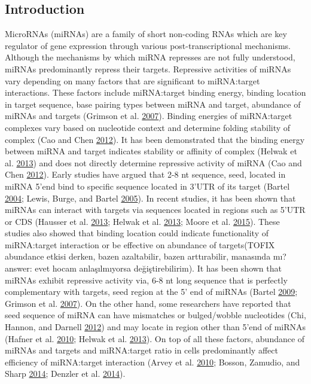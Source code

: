 \documentclass[]{article}
\begin{document}
\hypertarget{introduction}{%
\subsection{Introduction}\label{introduction}}

MicroRNAs (miRNAs) are a family of short non-coding RNAs which are key
regulator of gene expression through various post-transcriptional
mechanisms. Although the mechanisms by which miRNA represses are not
fully understood, miRNAs predominantly repress their targets. Repressive
activities of miRNAs vary depending on many factors that are significant
to miRNA:target interactions. These factors include miRNA:target binding
energy, binding location in target sequence, base pairing types between
miRNA and target, abundance of miRNAs and targets (Grimson et al.
\protect\hyperlink{ref-grimson_microrna_2007}{2007}). Binding energies
of miRNA:target complexes vary based on nucleotide context and determine
folding stability of complex (Cao and Chen
\protect\hyperlink{ref-cao_predicting_2012}{2012}). It has been
demonstrated that the binding energy between miRNA and target indicates
stability or affinity of complex (Helwak et al.
\protect\hyperlink{ref-helwak_mapping_2013}{2013}) and does not directly
determine repressive activity of miRNA (Cao and Chen
\protect\hyperlink{ref-cao_predicting_2012}{2012}). Early studies have
argued that 2-8 nt sequence, seed, located in miRNA 5'end bind to
specific sequence located in 3'UTR of its target (Bartel
\protect\hyperlink{ref-bartel_micrornas_2004}{2004}; Lewis, Burge, and
Bartel \protect\hyperlink{ref-lewis_conserved_2005}{2005}). In recent
studies, it has been shown that miRNAs can interact with targets via
sequences located in regions such as 5'UTR or CDS (Hausser et al.
\protect\hyperlink{ref-hausser_analysis_2013}{2013}; Helwak et al.
\protect\hyperlink{ref-helwak_mapping_2013}{2013}; Moore et al.
\protect\hyperlink{ref-moore_mirnatarget_2015}{2015}). These studies
also showed that binding location could indicate functionality of
miRNA:target interaction or be effective on abundance of targets(TOFIX
abundance etkisi derken, bazen azaltabilir, bazen arttırabilir,
manasında mı? answer: evet hocam anlaşılmıyorsa değiştirebilirim). It
has been shown that miRNAs exhibit repressive activity via, 6-8 nt long
sequence that is perfectly complementary with targets, seed region at
the 5' end of miRNAs (Bartel
\protect\hyperlink{ref-bartel_micrornas:_2009}{2009}; Grimson et al.
\protect\hyperlink{ref-grimson_microrna_2007}{2007}). On the other hand,
some researchers have reported that seed sequence of miRNA can have
mismatches or bulged/wobble nucleotides (Chi, Hannon, and Darnell
\protect\hyperlink{ref-chi2012alternative}{2012}) and may locate in
region other than 5'end of miRNAs (Hafner et al.
\protect\hyperlink{ref-hafner_transcriptome-wide_2010}{2010}; Helwak et
al. \protect\hyperlink{ref-helwak_mapping_2013}{2013}). On top of all
these factors, abundance of miRNAs and targets and miRNA:target ratio in
cells predominantly affect efficiency of miRNA:target interaction (Arvey
et al. \protect\hyperlink{ref-arvey_target_2010}{2010}; Bosson, Zamudio,
and Sharp \protect\hyperlink{ref-bosson_endogenous_2014}{2014}; Denzler
et al. \protect\hyperlink{ref-denzler_assessing_2014}{2014}).
\end{document}
